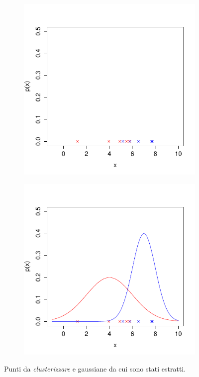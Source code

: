 \begin{figure}[h]
\centering
\begin{subfigure}[b]{0.5\textwidth}
    \centering
    \includegraphics[width=\columnwidth]{images/gmm_points}
    \caption{}
    \label{fig:gmm_points}
\end{subfigure}%
\begin{subfigure}[b]{0.5\textwidth}
    \centering
    \includegraphics[width=\columnwidth]{images/gmm_gaussians}
    \caption{}
    \label{fig:gmm_gaussians}
\end{subfigure}
\caption{Punti da \emph{clusterizzare} e gaussiane da cui sono stati estratti.}
\label{fig:gmm_example}
\end{figure}


